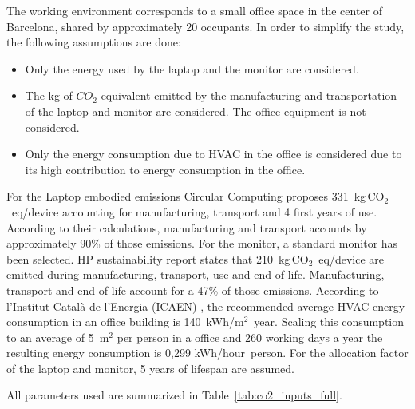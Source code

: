 The working environment corresponds to a small office space in the center of Barcelona, shared by approximately 20 occupants. In order to simplify the 
study, the following assumptions are done:

\begin{itemize}
    \item Only the energy used by the laptop and the monitor are considered.
    \item The kg of $CO_2$ equivalent emitted by the manufacturing and transportation of the laptop and monitor are considered. The office equipment is not considered.
    \item Only the energy consumption due to HVAC in the office is considered due to its high contribution to energy consumption in the office.
\end{itemize}


For the Laptop embodied emissions Circular Computing \cite{CircularComputing2022} proposes 331~kg\,CO$_2$~eq/device accounting for manufacturing,
transport and 4 first years of use. According to their calculations, manufacturing and transport accounts by approximately 90\% of those emissions.
For the monitor, a standard monitor has been selected. HP sustainability report \cite{HP2021MonitorLCA} states that 210~kg\,CO$_2$~eq/device 
are emitted during manufacturing, transport, use and end of life. Manufacturing, transport and end of life account for a 47\% of those emissions.
According to l'Institut Català de l'Energia (ICAEN) \cite{ICAEN}, the recommended average HVAC energy consumption in an office building is 140~kWh/m$^2$~year. 
Scaling this consumption to an average of 5~m$^2$ per person in a office and 260 working days a year the resulting energy consumption is 
0,299 kWh/hour~person. For the allocation factor of the laptop and monitor, 5 years of lifespan are assumed.

All parameters used are summarized in Table~\ref{tab:co2_inputs_full}.

